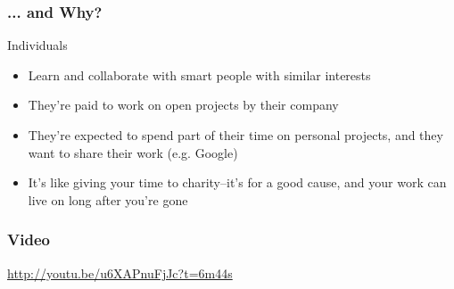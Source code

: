 \documentclass{beamer}
\begin{document}
\begin{frame}
  \frametitle{... and Why?}
    \begin{Large}Individuals\end{Large}
    \begin{itemize}
    \item Learn and collaborate with smart people with similar interests
    \item They're paid to work on open projects by their company
    \item They're expected to spend part of their time on personal projects, and they want to share their work (e.g. Google)
    \item It's like giving your time to charity--it's for a good cause, and your work can live on long after you're gone
    \end{itemize}
\end{frame}

\begin{frame}
  \frametitle{Video}
  \begin{center}
    \begin{LARGE}
      \href{http://youtu.be/u6XAPnuFjJc?t=6m44s}{http://youtu.be/u6XAPnuFjJc?t=6m44s}
    \end{LARGE}
  \end{center}

\end{frame}
\end{document}
